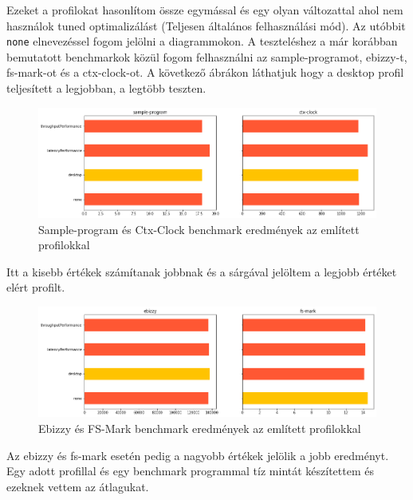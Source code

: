 Ezeket a profilokat hasonlítom össze egymással és egy olyan változattal ahol nem használok tuned optimalizálást (Teljesen általános felhasználási mód).
Az utóbbit \texttt{none} elnevezéssel fogom jelölni a diagrammokon.
A teszteléshez a már korábban bemutatott benchmarkok közül fogom felhasználni az sample-programot, ebizzy-t, fs-mark-ot és a ctx-clock-ot.
A következő ábrákon láthatjuk hogy a desktop profil teljesített a legjobban, a legtöbb teszten.
\begin{figure}[h!]
\centering
\includegraphics[width=\textwidth]{images/sampleProgramAndCtxClock.png}
\caption{Sample-program és Ctx-Clock benchmark eredmények az említett profilokkal}
\label{fig:tunedProfilesSampleprogramAndCtxClock}
\end{figure}

Itt a kisebb értékek számítanak jobbnak és a sárgával jelöltem a legjobb értéket elért profilt.

\begin{figure}[h!]
\centering
\includegraphics[width=\textwidth]{images/ebizzyAndFsMark.png}
\caption{Ebizzy és FS-Mark benchmark eredmények az említett profilokkal}
\label{fig:tunedProfilesEbizzyAndFsmark}
\end{figure}

Az ebizzy és fs-mark esetén pedig a nagyobb értékek jelölik a jobb eredményt.
Egy adott profillal és egy benchmark programmal tíz mintát készítettem és ezeknek vettem az átlagukat.

